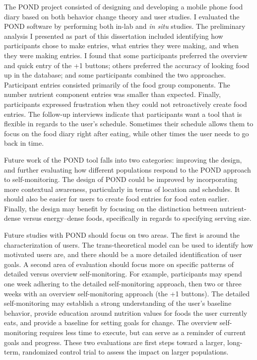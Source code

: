 The POND project consisted of designing and developing a mobile phone food diary based on both behavior change theory and user studies. I evaluated the POND software by performing both in-lab and \textit{in situ} studies. The preliminary analysis I presented as part of this dissertation included identifying how participants chose to make entries, what entries they were making, and when they were making entries. I found that some participants preferred the overview and quick entry of the +1 buttons; others preferred the accuracy of looking food up in the database; and some participants combined the two approaches. Participant entries consisted primarily of the food group components. The number nutrient component entries was smaller than expected. Finally, participants expressed frustration when they could not retroactively create food entries. The follow-up interviews indicate that participants want a tool that is flexible in regards to the user's schedule. Sometimes their schedule allows them to focus on the food diary right after eating, while other times the user needs to go back in time. 

Future work of the POND tool falls into two categories: improving the design, and further evaluating how different populations respond to the POND approach to self-monitoring. The design of POND could be improved by incorporating more contextual awareness, particularly in terms of location and schedules. It should also be easier for users to create food entries for food eaten earlier. Finally, the design may benefit by focusing on the distinction between nutrient-dense versus energy--dense foods, specifically in regards to specifying serving size. 

Future studies with POND should focus on two areas. The first is around the characterization of users. The trans-theoretical model can be used to identify how motivated users are, and there should be a more detailed identification of user goals. A second area of evaluation should focus more on specific patterns of detailed versus overview self-monitoring. For example, participants may spend one week adhering to the detailed self-monitoring approach, then two or three weeks with an overview self-monitoring approach (the +1 buttons).  The detailed self-monitoring may establish a strong understanding of the user's baseline behavior, provide education around nutrition values for foods the user currently eats, and provide a baseline for setting goals for change. The overview self-monitoring requires less time to execute, but can serve as a reminder of current goals and progress. These two evaluations are first steps toward a larger, long-term, randomized control trial to assess the impact on larger populations. 

